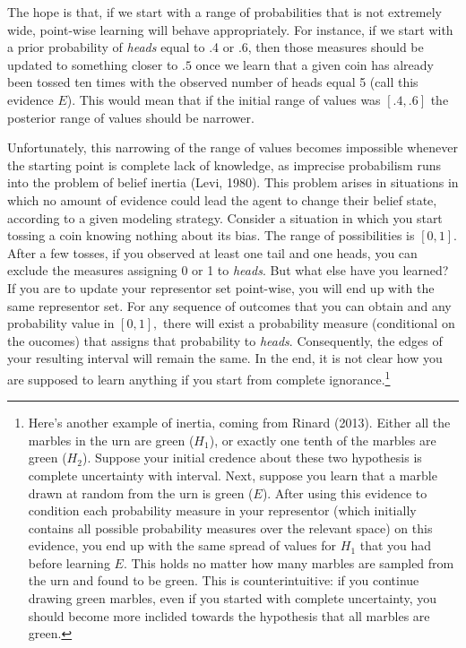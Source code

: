 \documentclass[
  letterpaper,
  DIV=11,
  numbers=noendperiod]{scrartcl}
\begin{document}
\noindent The hope is that, if we start with a range of probabilities
that is not extremely wide, point-wise learning will behave
appropriately. For instance, if we start with a prior probability of
\emph{heads} equal to .4 or .6, then those measures should be updated to
something closer to \(.5\) once we learn that a given coin has already
been tossed ten times with the observed number of heads equal 5 (call
this evidence \(E\)). This would mean that if the initial range of
values was \([.4,.6]\) the posterior range of values should be narrower.

Unfortunately, this narrowing of the range of values becomes impossible
whenever the starting point is complete lack of knowledge, as imprecise
probabilism runs into the problem of belief inertia (Levi, 1980). This
problem arises in situations in which no amount of evidence could lead
the agent to change their belief state, according to a given modeling
strategy. Consider a situation in which you start tossing a coin knowing
nothing about its bias. The range of possibilities is \([0,1]\). After a
few tosses, if you observed at least one tail and one heads, you can
exclude the measures assigning 0 or 1 to \emph{heads}. But what else
have you learned? If you are to update your representor set point-wise,
you will end up with the same representor set. For any sequence of
outcomes that you can obtain and any probability value in \([0, 1],\)
there will exist a probability measure (conditional on the oucomes) that
assigns that probability to \emph{heads}. Consequently, the edges of
your resulting interval will remain the same. In the end, it is not
clear how you are supposed to learn anything if you start from complete
ignorance.\footnote{Here's another example of inertia, coming from
  Rinard (2013). Either all the marbles in the urn are green (\(H_1\)),
  or exactly one tenth of the marbles are green (\(H_2\)). Suppose your
  initial credence about these two hypothesis is complete uncertainty
  with interval. Next, suppose you learn that a marble drawn at random
  from the urn is green (\(E\)). After using this evidence to condition
  each probability measure in your representor (which initially contains
  all possible probability measures over the relevant space) on this
  evidence, you end up with the same spread of values for \(H_1\) that
  you had before learning \(E\). This holds no matter how many marbles
  are sampled from the urn and found to be green. This is
  counterintuitive: if you continue drawing green marbles, even if you
  started with complete uncertainty, you should become more inclided
  towards the hypothesis that all marbles are green.}
\end{document}
